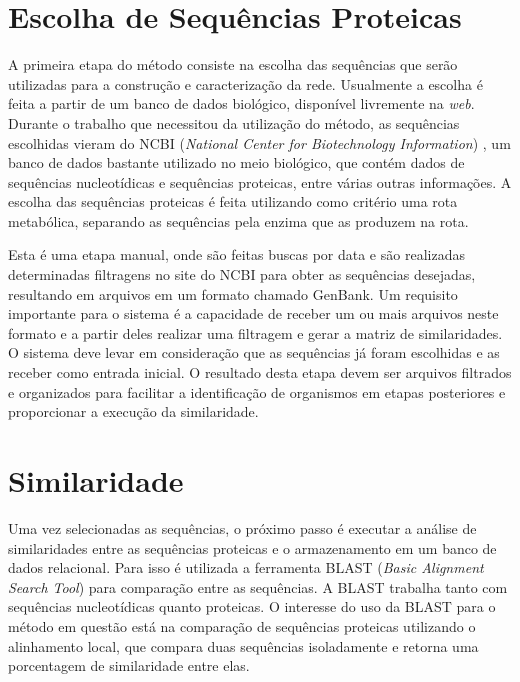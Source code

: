 \section{Escolha de Sequências Proteicas} \label{sec:escseq}

A primeira etapa do método consiste na escolha das sequências que serão utilizadas para a construção e caracterização da rede.
Usualmente a escolha é feita a partir de um banco de dados biológico, disponível livremente na \textit{web}. Durante o trabalho que necessitou da utilização
do método, as sequências escolhidas vieram do NCBI (\textit{National Center for Biotechnology Information}) \cite{ncbi},
um banco de dados bastante utilizado no
meio biológico, que contém dados de sequências
nucleotídicas e sequências proteicas, entre várias outras informações. A escolha das sequências proteicas é feita utilizando como critério
uma rota metabólica, separando as sequências pela enzima que as produzem na rota.


Esta é uma etapa manual, onde são feitas buscas por data e são realizadas determinadas filtragens no site do NCBI para obter as sequências desejadas, 
resultando em arquivos em um formato chamado GenBank. Um requisito importante para o sistema é a capacidade de receber um ou mais arquivos neste formato e
a partir deles
realizar uma filtragem e gerar a matriz de similaridades. O sistema deve levar em consideração que as sequências já foram escolhidas
e as receber como entrada inicial. O resultado desta etapa devem ser arquivos filtrados e organizados para facilitar a identificação de organismos em etapas
posteriores e proporcionar a execução da similaridade.

\section{Similaridade} \label{sec:similaridade}

Uma vez selecionadas as sequências, o próximo passo é executar a análise de similaridades entre as sequências proteicas e o armazenamento em um banco
de dados relacional. Para isso é utilizada a ferramenta BLAST (\textit{Basic Alignment Search Tool}) \cite{blast1997} para comparação entre as sequências.
A BLAST
trabalha tanto com sequências nucleotídicas quanto proteicas. O interesse do uso da BLAST para o método em questão está na comparação de sequências proteicas
utilizando o alinhamento local, que compara duas sequências isoladamente e retorna uma porcentagem de similaridade entre elas.

